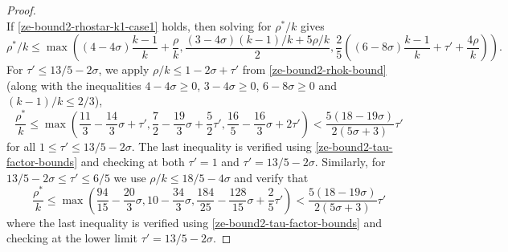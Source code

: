\begin{proof}
\begin{equation}
\end{equation}
If \eqref{ze-bound2-rhostar-k1-case1} holds, then solving for $\rho^*/k$ gives 
\[
\rho^*/k \le \max((4 - 4\sigma)\frac{k - 1}{k} + \frac{\rho}{k}, \frac{(3 - 4\sigma)(k - 1)/k + 5\rho/k}{2}, \frac{2}{5}((6 - 8\sigma)\frac{k - 1}{k} + \tau' + \frac{4\rho}{k})).
\]
For $\tau' \le 13/5 - 2\sigma$, we apply $\rho/k \le 1 - 2\sigma + \tau'$ from \eqref{ze-bound2-rhok-bound} (along with the inequalities $4 - 4\sigma \ge 0$, $3 - 4\sigma \ge 0$, $6 - 8\sigma \ge 0$ and $(k - 1)/k \le 2/3$),
\[
\frac{\rho^*}{k} \le \max\left(\frac{11}{3} - \frac{14}{3}\sigma + \tau', \frac{7}{2} - \frac{19}{3}\sigma + \frac{5}{2}\tau', \frac{16}{5} - \frac{16}{3}\sigma + 2\tau'\right) < \frac{5(18 - 19\sigma)}{2(5\sigma + 3)}\tau'
\]
for all $1 \le \tau' \le 13/5 - 2\sigma$. The last inequality is verified using \eqref{ze-bound2-tau-factor-bounds} and checking at both $\tau' = 1$ and $\tau' = 13/5-2\sigma$. Similarly, for $13/5 - 2\sigma \le \tau' \le 6/5$ we use $\rho/k \le 18/5-4\sigma$ and verify that 
\[
\frac{\rho^*}{k} \le \max\left(\frac{94}{15} - \frac{20}{3}\sigma, 10 - \frac{34}{3}\sigma, \frac{184}{25} - \frac{128}{15}\sigma + \frac{2}{5}\tau'\right) < \frac{5(18 - 19\sigma)}{2(5\sigma + 3)}\tau'
\]
where the last inequality is verified using \eqref{ze-bound2-tau-factor-bounds} and checking at the lower limit $\tau' = 13/5 - 2\sigma$. 


\end{proof}
